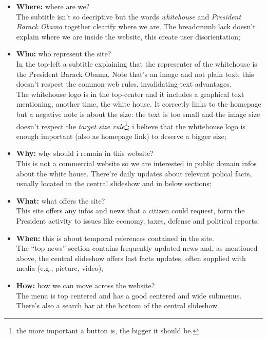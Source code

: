 \documentclass[
10pt, %
a4paper, %
oneside, %
headinclude,footinclude, %
BCOR5mm, %
]{scrartcl}
\begin{document}
\begin{itemize}%
	\item \textbf{Where:} where are we? \\ The subtitle isn't so decriptive but the words \emph{whitehouse} and \emph{President Barack Obama} together clearify where we are. The breadcrumb lack doesn't explain where we are inside the website, this create user disorientation;

	\item \textbf{Who:} who represent the site? \\ In the top-left a subtitle explaining that the representer of the whitehouse is the President Barack Obama. Note that's an image and not plain text, this doesn't respect the common web rules, invalidating text advantages. \\
	The whitehouse logo is in the top-center and it includes a graphical text mentioning, another time, the white house. It correctly links to the homepage but a negative note is about the size: the text is too small and the image size doesn't respect the \emph{target size rule}\footnote{the more important a button is, the bigger it should be.}; i believe that the whitehouse logo is enough important (also as homepage link) to deserve a bigger size;

	\item \textbf{Why:} why should i remain in this website? \\ This is not a commercial website so we are interested in public domain infos about the white house. There're daily updates about relevant polical facts, usually located in the central slideshow and in below sections;

	\item \textbf{What:} what offers the site? \\ This site offers any infos and news that a citizen could request, form the President activity to issues like economy, taxes, defense and political reports;

	\item \textbf{When:} this is about temporal references contained in the site. \\ The ``top news'' section contains frequently updated news and, as mentioned above, the central slideshow offers last facts updates, often supplied with media (e.g., picture, video); 

	\item \textbf{How:} how we can move across the website? \\ The menu is top centered and has a good centered and wide submenus. There's also a search bar at the bottom of the central slideshow.

\end{itemize}
\end{document}
